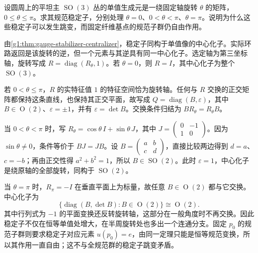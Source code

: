 \begin{exercise}\label{g1:ex:so3-gauge-stabilizers}
	设圆周上的平坦主 \(\operatorname{SO}(3)\) 丛的单值生成元是一绕固定轴旋转 \(\theta\) 的矩阵，\(0\le\theta\le\pi\)。求其规范稳定子，分别处理 \(\theta=0\)、\(0<\theta<\pi\)、\(\theta=\pi\)。说明为什么这些稳定子可以发生跳变，而固定纤维基点的规范子群仍自由作用。
\end{exercise}
\begin{solution}
	由\cref{g1:thm:gauge-stabilizer-centralizer}，稳定子同构于单值像的中心化子。实际环路返回是该旋转的逆，但一个元素与其逆具有同一中心化子。选定轴为第三坐标轴，旋转写成 \(R=\operatorname{diag}(R_\theta,1)\)。若 \(\theta=0\)，则 \(R=I\)，其中心化子为整个 \(\operatorname{SO}(3)\)。

	若 \(0<\theta\le\pi\)，\(R\) 的实特征值 \(1\) 的特征空间恰为旋转轴。任何与 \(R\) 交换的正交矩阵都保持这条直线，也保持其正交平面，故写成 \(Q=\operatorname{diag}(B,\varepsilon)\)，其中 \(B\in\operatorname{O}(2)\)、\(\varepsilon=\pm1\)，并有 \(\varepsilon=\det B\)。交换条件归结为 \(BR_\theta=R_\theta B\)。

	当 \(0<\theta<\pi\) 时，写 \(R_\theta=\cos\theta\,I+\sin\theta\,J\)，其中 \(J=\left(\begin{smallmatrix}0&-1\\1&0\end{smallmatrix}\right)\)。因为 \(\sin\theta\ne0\)，条件等价于 \(BJ=JB\)。设 \(B=\left(\begin{smallmatrix}a&b\\c&d\end{smallmatrix}\right)\)，直接比较两边得到 \(d=a\)、\(c=-b\)；再由正交性得 \(a^2+b^2=1\)，所以 \(B\in\operatorname{SO}(2)\)。此时 \(\varepsilon=1\)，中心化子是绕原轴的全部旋转，同构于 \(\operatorname{SO}(2)\)。

	当 \(\theta=\pi\) 时，\(R_\pi=-I\) 在垂直平面上为标量，故任意 \(B\in\operatorname{O}(2)\) 都与它交换。中心化子为
	\[
		\{\operatorname{diag}(B,\det B):B\in\operatorname{O}(2)\}
		\cong\operatorname{O}(2).
	\]
	其中行列式为 \(-1\) 的平面变换还反转旋转轴，这部分在一般角度时不再交换。因此稳定子不仅在恒等单值处增大，在半周旋转处也多出一个连通分支。固定 \(p_0\) 的规范子群则要求稳定子对应元素 \(u(p_0)=e\)，由同一定理只能是恒等规范变换，所以其作用一直自由；这不与全规范群的稳定子跳变矛盾。
\end{solution}

